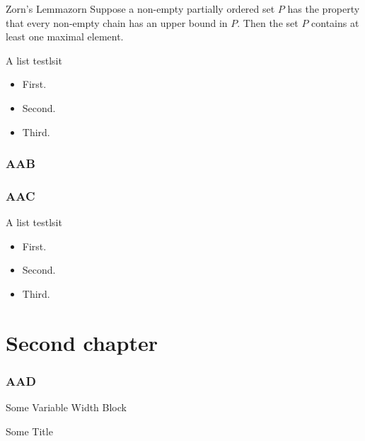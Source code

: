 \documentclass[3m,twoside]{libro-matua}
\begin{document}
\begin{lema}{Zorn's Lemma}{zorn}
Suppose a non-empty partially ordered set $P$ has the property that every non-empty chain has an upper bound in $P$. Then the set $P$ contains at least one maximal element.
\end{lema}
\begin{lema}{A list test}{lsit}
\begin{itemize}
\item First.
\item Second.
\item Third.
\end{itemize}
\end{lema}

\subsection{AAB}
\lipsum
\subsection{AAC}
\lipsum[4-5]
\begin{lema}{A list test}{lsit}
\begin{itemize}
\item First.
\item Second.
\item Third.
\end{itemize}
\lipsum[1-3]
\end{lema}

\chapter{Second chapter}
\PartialToc
\subsection{AAD}
\begin{MyBlock}{Some Variable Width Block}
\lipsum[4]
\end{MyBlock}

\begin{MyBlock}[.5\linewidth]{Some Title}
\lipsum[4]
\end{MyBlock}
\lipsum
\end{document}
